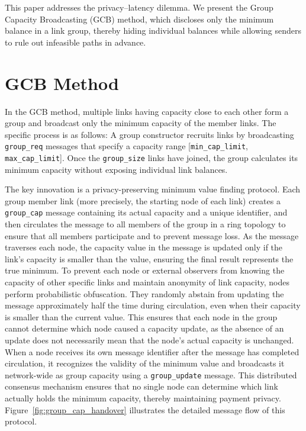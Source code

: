 \documentclass[a4paper]{IEEEtran}
\newcommand{\groupcap}{\texttt{group\_cap}}
\newcommand{\groupupdate}{\texttt{group\_update}}
\newcommand{\groupreq}{\texttt{group\_req}}
\newcommand{\groupsize}{\texttt{group\_size}}
\newcommand{\mincaplimit}{\texttt{min\_cap\_limit}}
\newcommand{\maxcaplimit}{\texttt{max\_cap\_limit}}
\begin{document}
This paper addresses the privacy–latency dilemma.
We present the Group Capacity Broadcasting (GCB) method, which discloses only the minimum balance in a link group, thereby hiding individual balances while allowing senders to rule out infeasible paths in advance.

\section{GCB Method}

In the GCB method, multiple links having capacity close to each other form a group and broadcast only the minimum capacity of the member links.
The specific process is as follows:
A group constructor recruits links by broadcasting \groupreq{} messages that specify a capacity range [\mincaplimit{}, \maxcaplimit{}].
Once the \groupsize{} links have joined, the group calculates its minimum capacity without exposing individual link balances.

The key innovation is a privacy-preserving minimum value finding protocol.
Each group member link (more precisely, the starting node of each link) creates a \groupcap{} message containing its actual capacity and a unique identifier, and then circulates the message to all members of the group in a ring topology to ensure that all members participate and to prevent message loss.
As the message traverses each node, the capacity value in the message is updated only if the link's capacity is smaller than the value, ensuring the final result represents the true minimum.
To prevent each node or external observers from knowing the capacity of other specific links and maintain anonymity of link capacity, nodes perform probabilistic obfuscation.
They randomly abstain from updating the message approximately half the time during circulation, even when their capacity is smaller than the current value.
This ensures that each node in the group cannot determine which node caused a capacity update, as the absence of an update does not necessarily mean that the node's actual capacity is unchanged.
When a node receives its own message identifier after the message has completed circulation, it recognizes the validity of the minimum value and broadcasts it network-wide as group capacity using a \groupupdate{} message.
This distributed consensus mechanism ensures that no single node can determine which link actually holds the minimum capacity, thereby maintaining payment privacy.
Figure~\ref{fig:group_cap_handover} illustrates the detailed message flow of this protocol.
\end{document}
